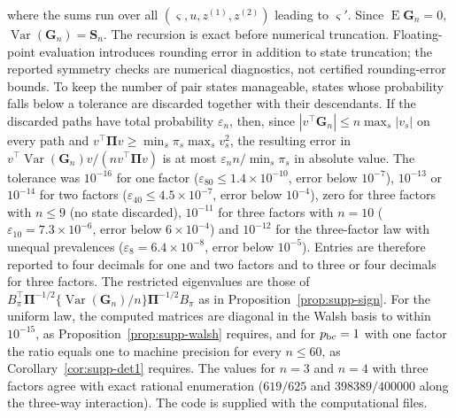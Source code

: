 \documentclass[12pt,a4paper]{article}
\theoremstyle{definition}
\theoremstyle{remark}\newtheorem{remark}{Remark}
\numberwithin{equation}{section}
\newcommand{\E}{\operatorname{E}}
\newcommand{\Var}{\operatorname{Var}}
\begin{document}
where the sums run over all $(\varsigma,u,z^{(1)},z^{(2)})$ leading to $\varsigma'$. Since $\E\bm G_n=0$, $\Var(\bm G_n)=\bm S_n$. The recursion is exact before numerical truncation. Floating-point evaluation introduces rounding error in addition to state truncation; the reported symmetry checks are numerical diagnostics, not certified rounding-error bounds. To keep the number of pair states manageable, states whose probability falls below a tolerance are discarded together with their descendants. If the discarded paths have total probability $\varepsilon_n$, then, since $|v^\top\bm G_n|\le n\max_s|v_s|$ on every path and $v^\top\bm\Pi v\ge\min_s\pi_s\max_sv_s^2$, the resulting error in $v^\top\Var(\bm G_n)v/(nv^\top\bm\Pi v)$ is at most $\varepsilon_nn/\min_s\pi_s$ in absolute value. The tolerance was $10^{-16}$ for one factor ($\varepsilon_{80}\le1.4\times10^{-10}$, error below $10^{-7}$), $10^{-13}$ or $10^{-14}$ for two factors ($\varepsilon_{40}\le4.5\times10^{-7}$, error below $10^{-4}$), zero for three factors with $n\le9$ (no state discarded), $10^{-11}$ for three factors with $n=10$ ($\varepsilon_{10}=7.3\times10^{-6}$, error below $6\times10^{-4}$) and $10^{-12}$ for the three-factor law with unequal prevalences ($\varepsilon_8=6.4\times10^{-8}$, error below $10^{-5}$). Entries are therefore reported to four decimals for one and two factors and to three or four decimals for three factors. The restricted eigenvalues are those of $B_\pi^\top\bm\Pi^{-1/2}\{\Var(\bm G_n)/n\}\bm\Pi^{-1/2}B_\pi$ as in Proposition~\ref{prop:supp-sign}. For the uniform law, the computed matrices are diagonal in the Walsh basis to within $10^{-15}$, as Proposition~\ref{prop:supp-walsh} requires, and for $p_{\rm bc}=1$ with one factor the ratio equals one to machine precision for every $n\le60$, as Corollary~\ref{cor:supp-det1} requires. The values for $n=3$ and $n=4$ with three factors agree with exact rational enumeration ($619/625$ and $398389/400000$ along the three-way interaction). The code is supplied with the computational files.
\end{document}
